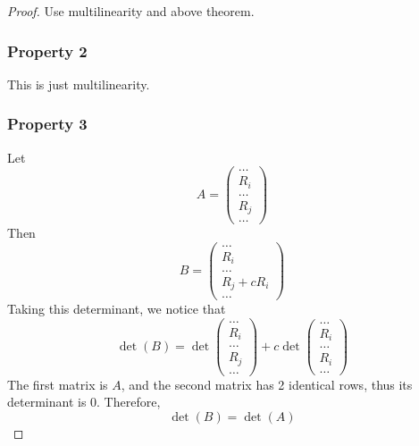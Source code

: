 \documentclass{article}
\newtheorem{one minute paper}[theorem]{One Minute Paper}
\begin{document}
\begin{proof}
    Use multilinearity and above theorem. 
    \subsubsection*{Property 2}
    This is just multilinearity. 
    \subsubsection*{Property 3}
    Let
    \begin{equation}
        A = \begin{pmatrix}
            \dots \\
            R_i \\
            \dots \\
            R_j \\
            \dots 
        \end{pmatrix}
    \end{equation}
    Then 
    \begin{equation}
        B = \begin{pmatrix}
            \dots \\
            R_i \\
            \dots \\
            R_j + cR_i\\
            \dots 
        \end{pmatrix}
    \end{equation}
    Taking this determinant, we notice that 
    \begin{equation}
        \det(B) = \det\begin{pmatrix}
            \dots \\
            R_i \\
            \dots \\
            R_j\\
            \dots
        \end{pmatrix} + c \det\begin{pmatrix}
            \dots \\
            R_i \\
            \dots \\
            R_i\\
            \dots
        \end{pmatrix}
    \end{equation}
    The first matrix is $A$, and the second matrix has 2 identical rows, thus its determinant is $0$. Therefore, 
    \begin{equation}
        \det(B) = \det(A)
    \end{equation}

\end{proof}
\end{document}
